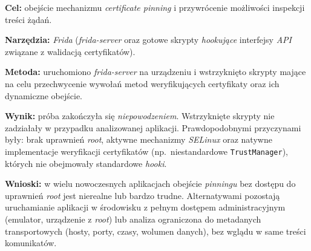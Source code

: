 \textbf{Cel:} obejście mechanizmu \emph{certificate pinning} i przywrócenie możliwości inspekcji treści żądań.

\textbf{Narzędzia:} \textit{Frida} (\textit{frida-server} oraz gotowe skrypty \emph{hookujące} interfejsy \emph{API} związane z walidacją certyfikatów).

\textbf{Metoda:} uruchomiono \textit{frida-server} na urządzeniu i wstrzyknięto skrypty mające na celu przechwycenie wywołań metod weryfikujących certyfikaty oraz ich dynamiczne obejście.

\textbf{Wynik:} próba zakończyła się \textit{niepowodzeniem}. Wstrzyknięte skrypty nie zadziałały w przypadku analizowanej aplikacji. Prawdopodobnymi przyczynami były: brak uprawnień \emph{root}, aktywne mechanizmy \emph{SELinux} oraz natywne implementacje weryfikacji certyfikatów (np.\ niestandardowe \texttt{TrustManager}), których nie obejmowały standardowe \emph{hooki}.

\textbf{Wnioski:} w wielu nowoczesnych aplikacjach obejście \emph{pinningu} bez dostępu do uprawnień \emph{root} jest nierealne lub bardzo trudne. Alternatywami pozostają uruchamianie aplikacji w środowisku z pełnym dostępem administracyjnym (emulator, urządzenie z \emph{root}) lub analiza ograniczona do metadanych transportowych (hosty, porty, czasy, wolumen danych), bez wglądu w same treści komunikatów.




